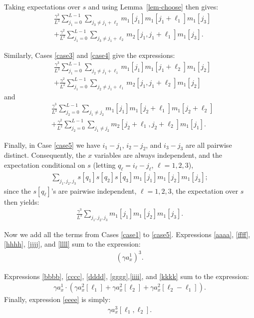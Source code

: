 \documentclass[12pt]{article}
\newcommand{\1}{\mathbf{1}}
\newcommand{\M}{m}
\theoremstyle{plain}
\theoremstyle{definition}
\theoremstyle{remark}
\theoremstyle{plain}
\theoremstyle{remark}
\theoremstyle{plain}
\theoremstyle{plain}
\theoremstyle{plain}
\numberwithin{equation}{section}
\begin{document}
Taking expectations over $s$ and using Lemma~\ref{lem-choose} then gives:
%
\begin{align}
%
& \frac{\gamma^3}{L^3} \sum_{j_1=0}^{L-1} \sum_{j_3 \ne j_1 + \ell_2} 
\M_1[j_1] \M_1[j_1 + \ell_1] \M_1[j_3]
\label{ffff} \\
& + \frac{\gamma^2}{L^2} \sum_{j_1=0}^{L-1} \sum_{j_3 \ne j_1 + \ell_2}  
\M_2[j_1,j_1+\ell_1] \M_1[j_3].
\label{gggg}
%
\end{align}


Similarly, Cases \ref{case3} and \ref{case4} give the expressions:
%
\begin{align}
%
& \frac{\gamma^3}{L^3} \sum_{j_1=0}^{L-1} \sum_{j_2 \ne j_1 + \ell_1} 
\M_1[j_1] \M_1[j_1 + \ell_2] \M_1[j_2]
\label{hhhh} \\
& + \frac{\gamma^2}{L^2} \sum_{j_1=0}^{L-1} \sum_{j_2 \ne j_1 + \ell_1}  
\M_2[j_1,j_1+\ell_2] \M_1[j_2]
\label{iiii}
%
\end{align}
%
and
%
\begin{align}
%
& \frac{\gamma^3}{L^3} \sum_{j_2=0}^{L-1} \sum_{j_1 \ne j_2} 
\M_1[j_1] \M_1[j_2 + \ell_1] \M_1[j_2 + \ell_2]
\label{jjjj}\\
& + \frac{\gamma^2}{L^2} \sum_{j_2=0}^{L-1} \sum_{j_1 \ne j_2}  
\M_2[j_2+\ell_1,j_2+\ell_2] \M_1[j_1].
\label{kkkk}
%
\end{align}

Finally, in Case \ref{case5} we have $i_1 - j_1$, $i_2 - j_2$, and $i_3 - j_3$ are all pairwise distinct. Consequently, the $x$ variables are always independent, and the expectation conditional on $s$ (letting $q_\ell = i_\ell - j_\ell$, $\ell=1,2,3$),
%
\begin{align}
%
\sum_{j_1,j_2,j_3} s[q_1] s[q_2] s[q_3] \M_1[j_1] \M_1[j_2] \M_1[j_3];
%
\end{align}
%
since the $s[q_\ell]$'s are pairwise independent, $\ell=1,2,3$, the expectation over $s$ then yields:
%
\begin{align} \label{llll}
%
\frac{\gamma^3}{L^3} \sum_{j_1,j_2,j_3} \M_1[j_1] \M_1[j_2] \M_1[j_3].
%
\end{align}

Now we add all the terms from Cases \ref{case1} to \ref{case5}. Expressions \eqref{aaaa}, \eqref{ffff}, \eqref{hhhh}, \eqref{jjjj}, and \eqref{llll} sum to the expression:
%
\begin{align}
%
(\gamma a_x^1)^3.
%
\end{align}

Expressions \eqref{bbbb}, \eqref{cccc}, \eqref{dddd}, \eqref{gggg},\eqref{iiii}, and \eqref{kkkk} sum to the expression:
%
\begin{align}
%
\gamma a_x^1  \cdot 
( \gamma a_x^2[\ell_1] + \gamma a_x^2[\ell_2] + \gamma a_x^2[\ell_2-\ell_1]).
%
\end{align}
%
Finally, expression \eqref{eeee} is simply:
%
\begin{align}
%
\gamma a_x^3[\ell_1,\ell_2].
%
\end{align}
%
\end{document}
